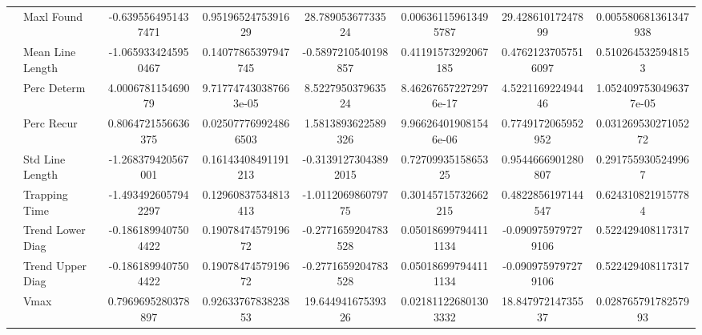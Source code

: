 \begin{tabular}{llcc|cc|cc}
 & Maxl Found & -0.6395564951437471 & 0.9519652475391629 & 28.78905367733524 & 0.006361159613495787 & 29.42861017247899 & 0.005580681361347938 \\
 & Mean Line Length & -1.0659334245950467 & 0.14077865397947745 & -0.5897210540198857 & 0.41191573292067185 & 0.47621237057516097 & 0.5102645325948153 \\
 & Perc Determ & 4.000678115469079 & 9.717747430387663e-05 & 8.522795037963524 & 8.462676572272976e-17 & 4.522116922494446 & 1.0524097530496377e-05 \\
 & Perc Recur & 0.8064721556636375 & 0.025077769924866503 & 1.5813893622589326 & 9.966264019081546e-06 & 0.7749172065952952 & 0.03126953027105272 \\
 & Std Line Length & -1.268379420567001 & 0.16143408491191213 & -0.31391273043892015 & 0.7270993515865325 & 0.9544666901280807 & 0.2917559305249967 \\
 & Trapping Time & -1.4934926057942297 & 0.12960837534813413 & -1.011206986079775 & 0.30145715732662215 & 0.4822856197144547 & 0.6243108219157784 \\
 & Trend Lower Diag & -0.1861899407504422 & 0.1907847457919672 & -0.2771659204783528 & 0.050186997944111134 & -0.0909759797279106 & 0.522429408117317 \\
 & Trend Upper Diag & -0.1861899407504422 & 0.1907847457919672 & -0.2771659204783528 & 0.050186997944111134 & -0.0909759797279106 & 0.522429408117317 \\
 & Vmax & 0.7969695280378897 & 0.9263376783823853 & 19.64494167539326 & 0.021811226801303332 & 18.84797214735537 & 0.02876579178257993 \\
\midrule
\bottomrule
\end{tabular}